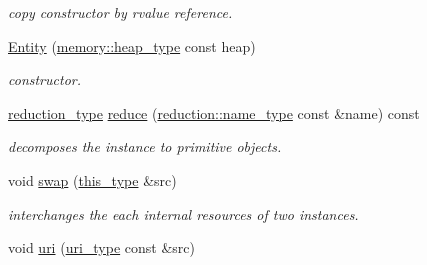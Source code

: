 \begin{DoxyCompactItemize}
\begin{DoxyCompactList}\small\item\em copy constructor by rvalue reference. \end{DoxyCompactList}\item 
\hypertarget{classhryky_1_1http_1_1header_1_1location_1_1_entity_a6593d8cb4e087db69cf7c75beed05c42}{\hyperlink{classhryky_1_1http_1_1header_1_1location_1_1_entity_a6593d8cb4e087db69cf7c75beed05c42}{Entity} (\hyperlink{classhryky_1_1memory_1_1heap_1_1_base}{memory\-::heap\-\_\-type} const heap)}\label{classhryky_1_1http_1_1header_1_1location_1_1_entity_a6593d8cb4e087db69cf7c75beed05c42}

\begin{DoxyCompactList}\small\item\em constructor. \end{DoxyCompactList}\item 
\hypertarget{classhryky_1_1http_1_1header_1_1location_1_1_entity_a37c73fc94b190fec95f699a309eb4587}{\hyperlink{namespacehryky_a343a9a4c36a586be5c2693156200eadc}{reduction\-\_\-type} \hyperlink{classhryky_1_1http_1_1header_1_1location_1_1_entity_a37c73fc94b190fec95f699a309eb4587}{reduce} (\hyperlink{namespacehryky_1_1reduction_ac686c30a4c8d196bbd0f05629a6b921f}{reduction\-::name\-\_\-type} const \&name) const }\label{classhryky_1_1http_1_1header_1_1location_1_1_entity_a37c73fc94b190fec95f699a309eb4587}

\begin{DoxyCompactList}\small\item\em decomposes the instance to primitive objects. \end{DoxyCompactList}\item 
\hypertarget{classhryky_1_1http_1_1header_1_1location_1_1_entity_a413119d6c436cd9ff95f63d08aada66e}{void \hyperlink{classhryky_1_1http_1_1header_1_1location_1_1_entity_a413119d6c436cd9ff95f63d08aada66e}{swap} (\hyperlink{classhryky_1_1http_1_1header_1_1location_1_1_entity_a49f0f7642755afebfca2a040ba041853}{this\-\_\-type} \&src)}\label{classhryky_1_1http_1_1header_1_1location_1_1_entity_a413119d6c436cd9ff95f63d08aada66e}

\begin{DoxyCompactList}\small\item\em interchanges the each internal resources of two instances. \end{DoxyCompactList}\item 
\hypertarget{classhryky_1_1http_1_1header_1_1location_1_1_entity_a8a0ddf2f49740f3b1450a7de8a0d5cf7}{void \hyperlink{classhryky_1_1http_1_1header_1_1location_1_1_entity_a8a0ddf2f49740f3b1450a7de8a0d5cf7}{uri} (\hyperlink{classhryky_1_1uri_1_1_entity}{uri\-\_\-type} const \&src)}\label{classhryky_1_1http_1_1header_1_1location_1_1_entity_a8a0ddf2f49740f3b1450a7de8a0d5cf7}


\end{DoxyCompactItemize}
